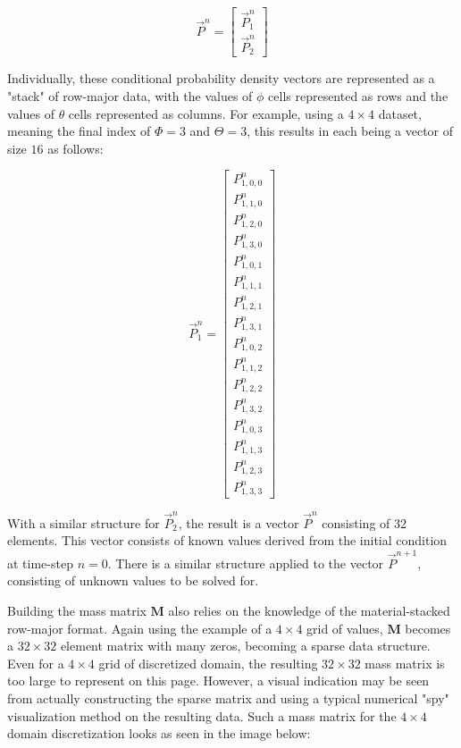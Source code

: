 \documentclass[12pt,a4paper,pagesize=pdftex]{scrartcl}
\begin{document}
\begin{equation*}
    \vec{P}^n =
    \begin{bmatrix}
        \vec{P}^n_1 \\
        \vec{P}^n_2
    \end{bmatrix}
\end{equation*}

Individually, these conditional probability density vectors are represented as a "stack" of row-major data, with the values of \(\phi\) cells represented as rows and the values of \(\theta\) cells represented as columns. For example, using a \(4 \times 4\) dataset, meaning the final index of \(\Phi = 3\) and \(\Theta = 3\), this results in each being a vector of size \(16\) as follows:

\begin{equation*}
    \vec{P}^n_1 =
    \begin{bmatrix}
        P^n_{1,0,0} \\
        P^n_{1,1,0} \\
        P^n_{1,2,0} \\
        P^n_{1,3,0} \\
        P^n_{1,0,1} \\
        P^n_{1,1,1} \\
        P^n_{1,2,1} \\
        P^n_{1,3,1} \\
        P^n_{1,0,2} \\
        P^n_{1,1,2} \\
        P^n_{1,2,2} \\
        P^n_{1,3,2} \\
        P^n_{1,0,3} \\
        P^n_{1,1,3} \\
        P^n_{1,2,3} \\
        P^n_{1,3,3}
    \end{bmatrix}
\end{equation*}

With a similar structure for \(\vec{P}^n_2\), the result is a vector \(\vec{P}^n\) consisting of \(32\) elements. This vector consists of known values derived from the initial condition at time-step \(n=0\). There is a similar structure applied to the vector \(\vec{P}^{n+1}\), consisting of unknown values to be solved for.

Building the mass matrix \(\mathbf{M}\) also relies on the knowledge of the material-stacked row-major format. Again using the example of a \(4 \times 4\) grid of values, \(\mathbf{M}\) becomes a \(32 \times 32\) element matrix with many zeros, becoming a sparse data structure. Even for a \(4 \times 4\) grid of discretized domain, the resulting \(32 \times 32\) mass matrix is too large to represent on this page. However, a visual indication may be seen from actually constructing the sparse matrix and using a typical numerical "spy" visualization method on the resulting data. Such a mass matrix for the \(4 \times 4\) domain discretization looks as seen in the image below:
\end{document}

